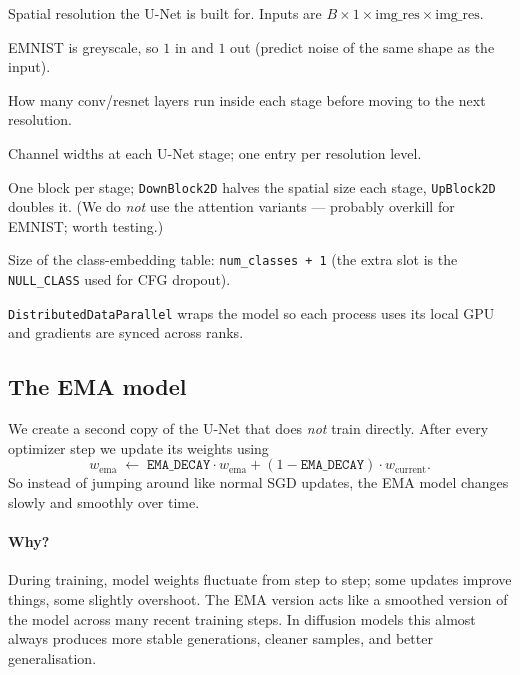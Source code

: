 \documentclass[11pt]{article}
\newcommand{\code}[1]{\texttt{#1}}
\begin{document}
\begin{description}[style=nextline,leftmargin=1.5em]
  \item[\code{sample\_size}] Spatial resolution the U-Net is built for.
        Inputs are $B \times 1 \times \text{img\_res} \times \text{img\_res}$.
  \item[\code{in\_channels / out\_channels}] EMNIST is greyscale, so $1$ in
        and $1$ out (predict noise of the same shape as the input).
  \item[\code{layers\_per\_block}] How many conv/resnet layers run inside
        each stage before moving to the next resolution.
  \item[\code{block\_out\_channels}] Channel widths at each U-Net stage; one
        entry per resolution level.
  \item[\code{down\_block\_types / up\_block\_types}] One block per stage;
        \code{DownBlock2D} halves the spatial size each stage, \code{UpBlock2D}
        doubles it. (We do \emph{not} use the attention variants --- probably
        overkill for EMNIST; worth testing.)
  \item[\code{num\_class\_embeds}] Size of the class-embedding table:
        \code{num\_classes + 1} (the extra slot is the \code{NULL\_CLASS}
        used for CFG dropout).
\end{description}

\code{DistributedDataParallel} wraps the model so each process uses its local
GPU and gradients are synced across ranks.

\subsection{The EMA model}

We create a second copy of the U-Net that does \emph{not} train directly.
After every optimizer step we update its weights using
\[
  w_{\text{ema}} \;\leftarrow\; \texttt{EMA\_DECAY}\cdot w_{\text{ema}}
                                 + (1 - \texttt{EMA\_DECAY}) \cdot w_{\text{current}}.
\]
So instead of jumping around like normal SGD updates, the EMA model changes
slowly and smoothly over time.

\paragraph{Why?} During training, model weights fluctuate from step to step;
some updates improve things, some slightly overshoot. The EMA version acts
like a smoothed version of the model across many recent training steps. In
diffusion models this almost always produces more stable generations, cleaner
samples, and better generalisation.
\end{document}
